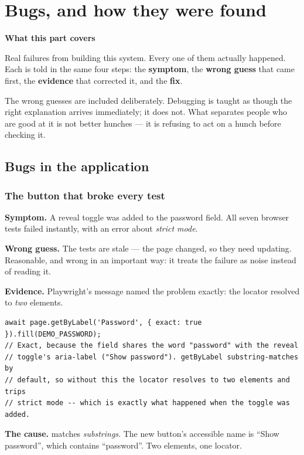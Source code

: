 \part{Bugs, and how they were found}

\noindent\textbf{\large What this part covers}

\medskip
\noindent
Real failures from building this system. Every one of them actually happened.
Each is told in the same four steps: the \textbf{symptom}, the \textbf{wrong
guess} that came first, the \textbf{evidence} that corrected it, and the
\textbf{fix}.

\medskip
\noindent
The wrong guesses are included deliberately. Debugging is taught as though the
right explanation arrives immediately; it does not. What separates people who
are good at it is not better hunches --- it is refusing to act on a hunch before
checking it.

\chapter{Bugs in the application}
\label{ch:bugs-frontend}

\section{The button that broke every test}

\textbf{Symptom.} A reveal toggle was added to the password field. All seven
browser tests failed instantly, with an error about \emph{strict mode}.

\textbf{Wrong guess.} The tests are stale --- the page changed, so they need
updating. Reasonable, and wrong in an important way: it treats the failure as
noise instead of reading it.

\textbf{Evidence.} Playwright's message named the problem exactly: the locator
resolved to \emph{two} elements.

\begin{lstlisting}[language=tsx]
await page.getByLabel('Password', { exact: true }).fill(DEMO_PASSWORD);
// Exact, because the field shares the word "password" with the reveal
// toggle's aria-label ("Show password"). getByLabel substring-matches by
// default, so without this the locator resolves to two elements and trips
// strict mode -- which is exactly what happened when the toggle was added.
\end{lstlisting}

\textbf{The cause.}  matches \emph{substrings}.
The new button's accessible name is ``Show password'', which contains
``password''. Two elements, one locator.

